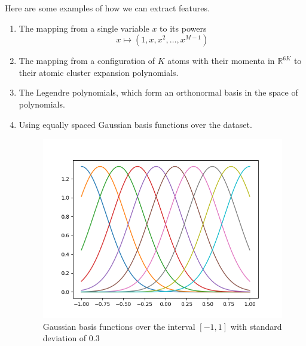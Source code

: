 \documentclass{article}
\begin{document}
      \begin{example}
        Here are some examples of how we can extract features. 
        \begin{enumerate}
          \item The mapping from a single variable $x$ to its powers 
            \begin{equation}
              x \mapsto (1, x, x^2, \ldots, x^{M-1})
            \end{equation}
          \item The mapping from a configuration of $K$ atoms with their momenta in $\mathbb{R}^{6K}$ to their atomic cluster expansion polynomials. 
          \item The Legendre polynomials, which form an orthonormal basis in the space of polynomials. 
          \item Using equally spaced Gaussian basis functions over the dataset. 
            \begin{figure}[H]
              \centering
              \includegraphics[scale=0.5]{img/Gaussian_basis_functions.png}
              \caption{Gaussian basis functions over the interval $[-1, 1]$ with standard deviation of $0.3$}
              \label{fig:Gaussian_basis_functions}
            \end{figure}
        \end{enumerate}
      \end{example}
\end{document}
